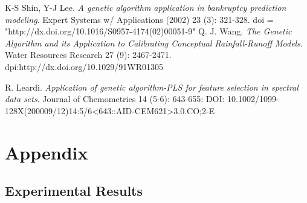 \documentclass[onecolumn]{article}
\begin{document}
\begin{multicols}{2}
\begin{thebibliography}{9}
		K-S Shin, Y-J Lee. \emph{A genetic algorithm application in bankruptcy prediction modeling}. Expert Systems w/ Applications (2002) 23 (3): 321-328. doi = "http://dx.doi.org/10.1016/S0957-4174(02)00051-9"
		Q. J. Wang. \emph{The Genetic Algorithm and its Application to Calibrating Conceptual Rainfall-Runoff Models}. Water Resources Research 27 (9): 2467-2471. dpi:http://dx.doi.org/10.1029/91WR01305

R. Leardi. \emph{Application of genetic algorithm-PLS for feature selection in spectral data sets}. Journal of Chemometrics 14 (5-6): 643-655: DOI: 10.1002/1099-128X(200009/12)14:5/6<643::AID-CEM621>3.0.CO;2-E

\end{thebibliography}
\end{multicols}

\section{Appendix}
\subsection{Experimental Results}




\end{document}
